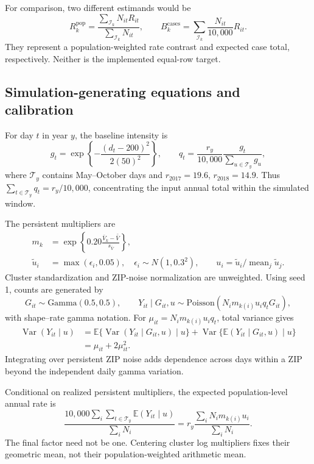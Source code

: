 \documentclass[11pt,letterpaper]{article}
\newcommand{\E}{\mathbb{E}}
\newcommand{\Var}{\operatorname{Var}}
\begin{document}
For comparison, two different estimands would be
\begin{equation}
 R_k^{\mathrm{pop}}=\frac{\sum_{\mathcal I_k}N_{it}R_{it}}{\sum_{\mathcal I_k}N_{it}},
 \qquad B_k^{\mathrm{cases}}=\sum_{\mathcal I_k}\frac{N_{it}}{10{,}000}R_{it}.
\end{equation}
They represent a population-weighted rate contrast and expected case total, respectively. Neither is the implemented equal-row target.

\subsection{Simulation-generating equations and calibration}
\label{supp:simulation}
For day \(t\) in year \(y\), the baseline intensity is
\begin{equation}
 g_t=\exp\left\{-\frac{(d_t-200)^2}{2(50)^2}\right\},\qquad
 q_t=\frac{r_y}{10{,}000}\frac{g_t}{\sum_{u\in\mathcal T_y}g_u},
\end{equation}
where \(\mathcal T_y\) contains May--October days and \(r_{2017}=19.6\), \(r_{2018}=14.9\). Thus \(\sum_{t\in\mathcal T_y}q_t=r_y/10{,}000\), concentrating the input annual total within the simulated window.

The persistent multipliers are
\begin{align}
 m_k&=\exp\left\{0.20\frac{\bar V_k-\overline{\bar V}}{s_{\bar V}}\right\},\\
 \widetilde u_i&=\max(\epsilon_i,0.05),\quad \epsilon_i\sim N(1,0.3^2),
 \qquad u_i=\widetilde u_i/\operatorname{mean}_j\widetilde u_j.
\end{align}
Cluster standardization and ZIP-noise normalization are unweighted. Using seed 1, counts are generated by
\begin{equation}
 G_{it}\sim\mathrm{Gamma}(0.5,0.5),\qquad
 Y_{it}\mid G_{it},u\sim\mathrm{Poisson}(N_im_{k(i)}u_iq_tG_{it}),
\end{equation}
with shape--rate gamma notation. For \(\mu_{it}=N_im_{k(i)}u_iq_t\), total variance gives
\begin{align}
 \Var(Y_{it}\mid u)
 &=\E\{\Var(Y_{it}\mid G_{it},u)\mid u\}
 +\Var\{\E(Y_{it}\mid G_{it},u)\mid u\}\\
 &=\mu_{it}+2\mu_{it}^2.
\end{align}
Integrating over persistent ZIP noise adds dependence across days within a ZIP beyond the independent daily gamma variation.

Conditional on realized persistent multipliers, the expected population-level annual rate is
\begin{equation}
 \frac{10{,}000\sum_i\sum_{t\in\mathcal T_y}\E(Y_{it}\mid u)}{\sum_iN_i}
 =r_y\frac{\sum_iN_im_{k(i)}u_i}{\sum_iN_i}.
\end{equation}
The final factor need not be one. Centering cluster log multipliers fixes their geometric mean, not their population-weighted arithmetic mean.
\end{document}
